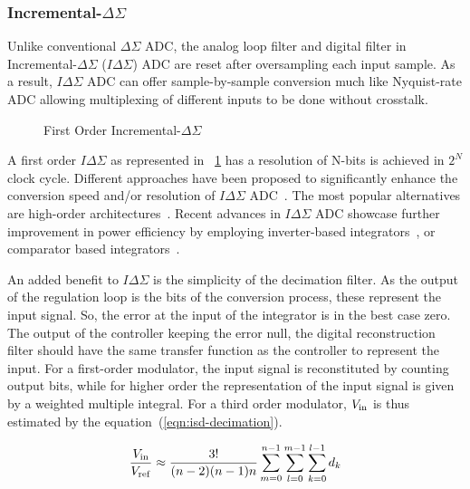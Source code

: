 \subsubsection{Incremental-\(\Delta\Sigma \)}
\label{sec:soa-isd}
Unlike conventional \(\Delta\Sigma \) ADC, the analog loop filter and digital filter in Incremental-\(\Delta\Sigma \) (\(I\Delta\Sigma \)) ADC are reset after oversampling each input sample. As a result, \(I\Delta\Sigma \) ADC can offer sample-by-sample conversion much like Nyquist-rate ADC allowing multiplexing of different inputs to be done without crosstalk.

\begin{figure}[htp]
	\centering
	\resizebox{\textwidth}{!} {}
	\caption{First Order Incremental-\(\Delta\Sigma \)}
	\label{fig:isd_first_order_principle}
\end{figure}

A first order \(I\Delta\Sigma \) as represented in \figurename~\ref{fig:isd_first_order_principle} has a resolution of N-bits is achieved in \(2^N \) clock cycle. Different approaches have been proposed to significantly enhance the conversion speed and/or resolution of \(I\Delta\Sigma \) ADC~\cite{Markus2004,Quiquempoix2006,Caldwell2010}. The most popular alternatives are high-order architectures~\cite{Au1997,Babanezhad1991,Baird1996}. Recent advances in \(I\Delta\Sigma \) ADC showcase further improvement in power efficiency by employing inverter-based integrators~\cite{Chae2009}, or comparator based integrators~\cite{Yamamoto2012}.

An added benefit to \(I\Delta\Sigma \) is the simplicity of the decimation filter. As the output of the regulation loop is the bits of the conversion process, these represent the input signal. So, the error at the input of the integrator is in the best case zero. The output of the controller keeping the error null, the digital reconstruction filter should have the same transfer function as the controller to represent the input. For a first-order modulator, the input signal is reconstituted by counting output bits, while for higher order the representation of the input signal is given by a weighted multiple integral. For a third order modulator, \(V_{\rm in}\) is thus estimated by the equation~(\ref{eqn:isd-decimation}).

\begin{equation}
	\frac{V_{\rm in}}{V_{\rm ref}}\approx \frac{3!}{(n-2)(n-1)n}\sum_{m=0}^{n-1}\sum_{l=0}^{m-1}\sum_{k=0}^{l-1}d_{k}
\label{eqn:isd-decimation}
\end{equation}

